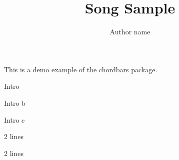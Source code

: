 \documentclass[11pt]{article}
\title{Song Sample}
\author{Author name}
\begin{document}
\songtitle

This is a demo example of the chordbars package.

\begin{chordbar}{4}{1}{Intro}
\repeatchord
\end{chordbar}

\begin{chordbar}{4}{1}{Intro b}
\repeatchord
{}
\end{chordbar}

\begin{chordbar}{4}{1}{Intro c}
\repeatchord
\repeatchord
\end{chordbar}




\begin{chordbarl}{12}{4}{2}{2 lines}
\end{chordbarl}

\begin{chordbarl}{11}{4}{3}{2 lines}
\end{chordbarl}
\end{document}
